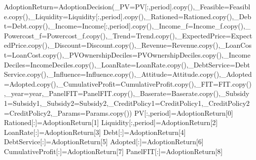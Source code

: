 \documentclass[
  letterpaper,
  DIV=11,
  numbers=noendperiod]{scrartcl}
\newenvironment{Shaded}{\begin{snugshade}}{\end{snugshade}}
\newcommand{\DecValTok}[1]{\textcolor[rgb]{0.68,0.00,0.00}{#1}}
\newcommand{\NormalTok}[1]{\textcolor[rgb]{0.00,0.23,0.31}{#1}}
\newcommand{\OperatorTok}[1]{\textcolor[rgb]{0.37,0.37,0.37}{#1}}
\begin{document}
\begin{Shaded}
\begin{Highlighting}[]
\NormalTok{        AdoptionReturn}\OperatorTok{=}\NormalTok{AdoptionDecision(\_PV}\OperatorTok{=}\NormalTok{PV[:,period].copy(),\_Feasible}\OperatorTok{=}\NormalTok{Feasible.copy(),\_Liquidity}\OperatorTok{=}\NormalTok{Liquidity[:,period].copy(),\_Rationed}\OperatorTok{=}\NormalTok{Rationed.copy(),\_Debt}\OperatorTok{=}\NormalTok{Debt.copy(),\_Income}\OperatorTok{=}\NormalTok{Income[:,period].copy(),\_Income\_f}\OperatorTok{=}\NormalTok{Income\_f.copy(),\_Powercost\_f}\OperatorTok{=}\NormalTok{Powercost\_f.copy(),\_Trend}\OperatorTok{=}\NormalTok{Trend.copy(),\_ExpectedPrice}\OperatorTok{=}\NormalTok{ExpectedPrice.copy(),\_Discount}\OperatorTok{=}\NormalTok{Discount.copy(),\_Revenue}\OperatorTok{=}\NormalTok{Revenue.copy(),\_LoanCost}\OperatorTok{=}\NormalTok{LoanCost.copy(),\_PVOwnershipDeciles}\OperatorTok{=}\NormalTok{PVOwnershipDeciles.copy(),\_IncomeDeciles}\OperatorTok{=}\NormalTok{IncomeDeciles.copy(),\_LoanRate}\OperatorTok{=}\NormalTok{LoanRate.copy(),\_DebtService}\OperatorTok{=}\NormalTok{DebtService.copy(),\_Influence}\OperatorTok{=}\NormalTok{Influence.copy(),\_Attitude}\OperatorTok{=}\NormalTok{Attitude.copy(),\_Adopted}\OperatorTok{=}\NormalTok{Adopted.copy(),\_CumulativeProfit}\OperatorTok{=}\NormalTok{CumulativeProfit.copy(),\_FIT}\OperatorTok{=}\NormalTok{FIT.copy(),\_year}\OperatorTok{=}\NormalTok{year,\_PanelFIT}\OperatorTok{=}\NormalTok{PanelFIT.copy(),\_Baserate}\OperatorTok{=}\NormalTok{Baserate.copy(),\_Subsidy1}\OperatorTok{=}\NormalTok{Subsidy1,\_Subsidy2}\OperatorTok{=}\NormalTok{Subsidy2,\_CreditPolicy1}\OperatorTok{=}\NormalTok{CreditPolicy1,\_CreditPolicy2}\OperatorTok{=}\NormalTok{CreditPolicy2,\_Params}\OperatorTok{=}\NormalTok{Params.copy())}
\NormalTok{        PV[:,period]}\OperatorTok{=}\NormalTok{AdoptionReturn[}\DecValTok{0}\NormalTok{]}
\NormalTok{        Rationed[:]}\OperatorTok{=}\NormalTok{AdoptionReturn[}\DecValTok{1}\NormalTok{]}
\NormalTok{        Liquidity[:,period]}\OperatorTok{=}\NormalTok{AdoptionReturn[}\DecValTok{2}\NormalTok{]}
\NormalTok{        LoanRate[:]}\OperatorTok{=}\NormalTok{AdoptionReturn[}\DecValTok{3}\NormalTok{]}
\NormalTok{        Debt[:]}\OperatorTok{=}\NormalTok{AdoptionReturn[}\DecValTok{4}\NormalTok{]}
\NormalTok{        DebtService[:]}\OperatorTok{=}\NormalTok{AdoptionReturn[}\DecValTok{5}\NormalTok{]}
\NormalTok{        Adopted[:]}\OperatorTok{=}\NormalTok{AdoptionReturn[}\DecValTok{6}\NormalTok{]}
\NormalTok{        CumulativeProfit[:]}\OperatorTok{=}\NormalTok{AdoptionReturn[}\DecValTok{7}\NormalTok{]}
\NormalTok{        PanelFIT[:]}\OperatorTok{=}\NormalTok{AdoptionReturn[}\DecValTok{8}\NormalTok{]}

\end{Highlighting}
\end{Shaded}
\end{document}
